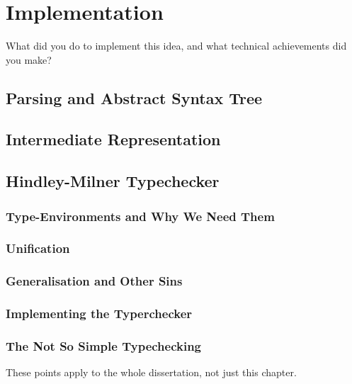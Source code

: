 \documentclass{l4proj}
\begin{document}
\chapter{Implementation}
What did you do to implement this idea, and what technical achievements did you make?

\section{Parsing and Abstract Syntax Tree}
\section{Intermediate Representation}
\section{Hindley-Milner Typechecker}
\subsection{Type-Environments and Why We Need Them}
\subsection{Unification}
\subsection{Generalisation and Other Sins}
\subsection{Implementing the Typerchecker}
\subsection{The Not So Simple Typechecking}





These points apply to the whole dissertation, not just this chapter.
\end{document}
